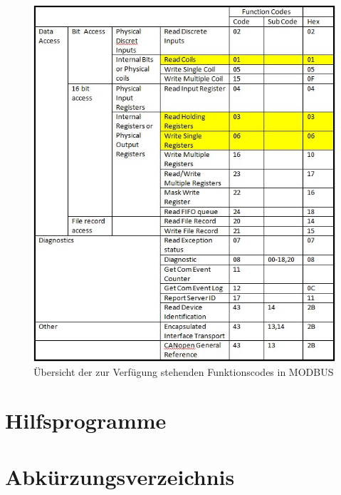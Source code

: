 \begin{figure}[hbtp]
\centering
\includegraphics[scale=0.65]{modbus/fcodetab}
\caption{Übersicht der zur Verfügung stehenden Funktionscodes in MODBUS \cite[S. 11]{ModbusDoc}}
\label{fig:fcodetab}
\end{figure} 
\chapter{Hilfsprogramme}

\chapter{Abkürzungsverzeichnis}

